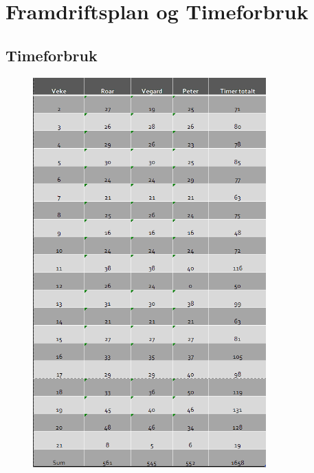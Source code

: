 



\thispagestyle{fancy}
\chapter{Framdriftsplan og Timeforbruk}

\section{Timeforbruk}
\begin{figure}[htbp]
    \thispagestyle{fancy}
    \centering
    \includegraphics[width=0.8\textwidth]{Vedlegg/TimelisteKort.png}
\end{figure}

\newpage
